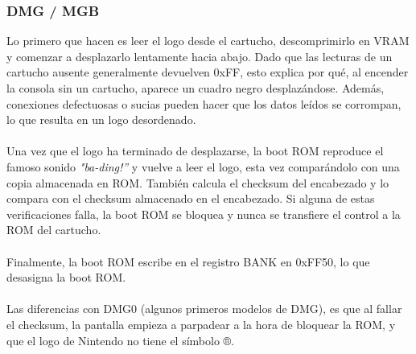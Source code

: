 \subsubsection{DMG / MGB}
Lo primero que hacen es leer el logo desde el cartucho, descomprimirlo en VRAM y comenzar a desplazarlo lentamente hacia abajo. Dado que las lecturas de un cartucho ausente generalmente devuelven 0xFF, esto explica por qué, al encender la consola sin un cartucho, aparece un cuadro negro desplazándose. Además, conexiones defectuosas o sucias pueden hacer que los datos leídos se corrompan, lo que resulta en un logo desordenado.
\\\\
Una vez que el logo ha terminado de desplazarse, la boot ROM reproduce el famoso sonido \textit{"ba-ding!”} y vuelve a leer el logo, esta vez comparándolo con una copia almacenada en ROM. También calcula el checksum del encabezado y lo compara con el checksum almacenado en el encabezado. Si alguna de estas verificaciones falla, la boot ROM se bloquea y nunca se transfiere el control a la ROM del cartucho.
\\\\
Finalmente, la boot ROM escribe en el registro BANK en 0xFF50, lo que desasigna la boot ROM.
\\\\
Las diferencias con DMG0 (algunos primeros modelos de DMG), es que al fallar el checksum, la pantalla empieza a parpadear a la hora de bloquear la ROM, y que el logo de Nintendo no tiene el símbolo ®.

